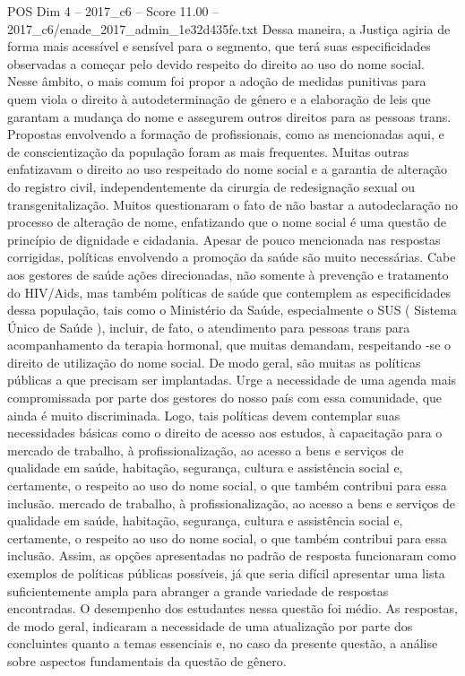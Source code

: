 \begin{textsample}{POS Dim 4 – 2017\_c6 – Score 11.00 – 2017\_c6/enade\_2017\_admin\_1e32d435fe.txt}
Dessa maneira, a Justiça agiria de forma mais acessível e sensível para o segmento, que terá suas especificidades observadas a começar pelo devido respeito do direito ao uso do nome social.
Nesse âmbito, o mais comum foi propor a adoção de medidas punitivas para quem viola o direito à autodeterminação de gênero e a elaboração de leis que garantam a mudança do nome e assegurem outros direitos para as pessoas trans.
Propostas envolvendo a formação de profissionais, como as mencionadas aqui, e de conscientização da população foram as mais frequentes.
Muitas outras enfatizavam o direito ao uso respeitado do nome social e a garantia de alteração do registro civil, independentemente da cirurgia de redesignação sexual ou transgenitalização.
Muitos questionaram o fato de não bastar a autodeclaração no processo de alteração de nome, enfatizando que o nome social é uma questão de princípio de dignidade e cidadania.
Apesar de pouco mencionada nas respostas corrigidas, políticas envolvendo a promoção da saúde são muito necessárias.
Cabe aos gestores de saúde ações direcionadas, não somente à prevenção e tratamento do HIV/Aids, mas também políticas de saúde que contemplem as especificidades dessa população, tais como o Ministério da Saúde, especialmente o SUS ( Sistema Único de Saúde ), incluir, de fato, o atendimento para pessoas trans para acompanhamento da terapia hormonal, que muitas demandam, respeitando -se o direito de utilização do nome social.
De modo geral, são muitas as políticas públicas a que precisam ser implantadas.
Urge a necessidade de uma agenda mais compromissada por parte dos gestores do nosso país com essa comunidade, que ainda é muito discriminada.
Logo, tais políticas devem contemplar suas necessidades básicas como o direito de acesso aos estudos, à capacitação para o mercado de trabalho, à profissionalização, ao acesso a bens e serviços de qualidade em saúde, habitação, segurança, cultura e assistência social e, certamente, o respeito ao uso do nome social, o que também contribui para essa inclusão. mercado de trabalho, à profissionalização, ao acesso a bens e serviços de qualidade em saúde, habitação, segurança, cultura e assistência social e, certamente, o respeito ao uso do nome social, o que também contribui para essa inclusão.
Assim, as opções apresentadas no padrão de resposta funcionaram como exemplos de políticas públicas possíveis, já que seria difícil apresentar uma lista suficientemente ampla para abranger a grande variedade de respostas encontradas.
O desempenho dos estudantes nessa questão foi médio.
As respostas, de modo geral, indicaram a necessidade de uma atualização por parte dos concluintes quanto a temas essenciais e, no caso da presente questão, a análise sobre aspectos fundamentais da questão de gênero.

\end{textsample}
